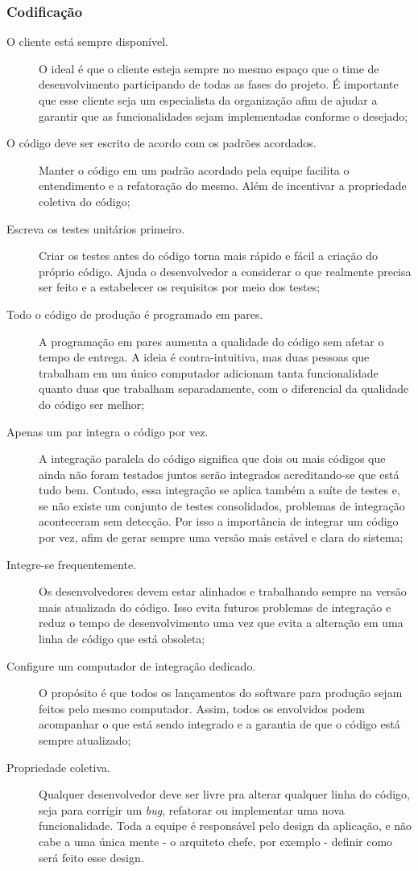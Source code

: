 \subsubsection{Codificação}
\begin{description}
    \item[O cliente está sempre disponível.] O ideal é que o cliente esteja sempre
    no mesmo espaço que o time de desenvolvimento participando de todas as fases
    do projeto. É importante que esse cliente seja um especialista da organização
    afim de ajudar a garantir que as funcionalidades sejam implementadas conforme
    o desejado;
    \item[O código deve ser escrito de acordo com os padrões acordados.] Manter o
    código em um padrão acordado pela equipe facilita o entendimento e a refatoração
    do mesmo. Além de incentivar a propriedade coletiva do código;
    \item[Escreva os testes unitários primeiro.] Criar os testes antes do código
    torna mais rápido e fácil a criação do próprio código. Ajuda o desenvolvedor a
    considerar o que realmente precisa ser feito e a estabelecer os requisitos por
    meio dos testes;
    \item[Todo o código de produção é programado em pares.] A programação em pares
    aumenta a qualidade do código sem afetar o tempo de entrega. A ideia é
    contra-intuitiva, mas duas pessoas que trabalham em um único computador adicionam
    tanta funcionalidade quanto duas que trabalham separadamente, com o diferencial
    da qualidade do código ser melhor;
    \item[Apenas um par integra o código por vez.] A integração paralela do código
    significa que dois ou mais códigos que ainda não foram testados juntos serão
    integrados acreditando-se que está tudo bem. Contudo, essa integração se aplica
    também a suíte de testes e, se não existe um conjunto de testes consolidados,
    problemas de integração aconteceram sem detecção. Por isso a importância de
    integrar um código por vez, afim de gerar sempre uma versão mais estável e clara
    do sistema;
    \item[Integre-se frequentemente.] Os desenvolvedores devem estar alinhados e
    trabalhando sempre na versão mais atualizada do código. Isso evita futuros
    problemas de integração e reduz o tempo de desenvolvimento uma vez que evita
    a alteração em uma linha de código que está obsoleta;
    \item[Configure um computador de integração dedicado.] O propósito é que todos os
    lançamentos do software para produção sejam feitos pelo mesmo computador. Assim,
    todos os envolvidos podem acompanhar o que está sendo integrado e a garantia de
    que o código está sempre atualizado;
    \item[Propriedade coletiva.] Qualquer desenvolvedor deve ser livre pra alterar
    qualquer linha do código, seja para corrigir um \textit{bug}, refatorar ou
    implementar uma nova funcionalidade. Toda a equipe é responsável pelo design da
    aplicação, e não cabe a uma única mente - o arquiteto chefe, por exemplo - definir
    como será feito esse design.
\end{description}

